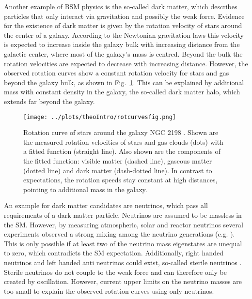 \noindent Another example of BSM physics is the so-called dark matter, which describes particles that only interact via gravitation and possibly the weak force. Evidence for the existence of dark matter is given by the rotation velocity of stars around the center of a galaxy. According to the Newtonian gravitation laws this velocity is expected to increase inside the galaxy bulk with increasing distance from the galactic center, where most of the galaxy's mass is centred. Beyond the bulk the rotation velocities are expected to decrease with increasing distance. However, the observed rotation curves show a constant rotation velocity for stars and gas beyond the galaxy bulk, as shown in Fig.~\ref{fig:theo:rotcurves}. This can be explained by additional mass with constant density in the galaxy, the so-called dark matter halo, which extends far beyond the galaxy.\\ 
 
\begin{figure}
	\centering
	\texttt{[image: ../plots/theoIntro/rotcurvesfig.png]}
	\caption[Rotation curve of stars around the galaxy NGC 2198]{Rotation curve of stars around the galaxy NGC 2198 \cite{rotcurves}. Shown are the measured rotation velocities of stars and gas clouds (dots) with a fitted function (straight line). Also shown are the components of the fitted function: visible matter (dashed line), gaseous matter (dotted line) and dark matter (dash-dotted line). In contrast to expectations, the rotation speeds stay constant at high distances, pointing to additional mass in the galaxy.}
	\label{fig:theo:rotcurves}
\end{figure}

\noindent An example for dark matter candidates are neutrinos, which pass all requirements of a dark matter particle. Neutrinos are assumed to be massless in the SM. However, by measuring atmospheric, solar and reactor neutrinos several experiments observed a strong mixing among the neutrino generations (e.g. \cite{nuoszi1,nuoszi2,nuoszi3,nuoszi4}). This is only possible if at least two of the neutrino mass eigenstates are unequal to zero, which contradicts the SM expectation. Additionally, right handed neutrinos and left handed anti neutrinos could exist, so-called sterile neutrinos \cite{sterilenu}. Sterile neutrinos do not couple to the weak force and can therefore only be created by oscillation. However, current upper limits on the neutrino masses are too small \cite{numasses1,numasses2} to explain the observed rotation curves using only neutrinos.\\

